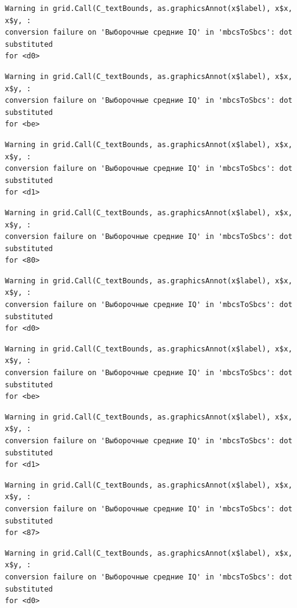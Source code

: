\documentclass[
  letterpaper,
]{scrbook}
\theoremstyle{definition}
\theoremstyle{remark}
\begin{document}
\begin{verbatim}
Warning in grid.Call(C_textBounds, as.graphicsAnnot(x$label), x$x, x$y, :
conversion failure on 'Выборочные средние IQ' in 'mbcsToSbcs': dot substituted
for <d0>
\end{verbatim}

\begin{verbatim}
Warning in grid.Call(C_textBounds, as.graphicsAnnot(x$label), x$x, x$y, :
conversion failure on 'Выборочные средние IQ' in 'mbcsToSbcs': dot substituted
for <be>
\end{verbatim}

\begin{verbatim}
Warning in grid.Call(C_textBounds, as.graphicsAnnot(x$label), x$x, x$y, :
conversion failure on 'Выборочные средние IQ' in 'mbcsToSbcs': dot substituted
for <d1>
\end{verbatim}

\begin{verbatim}
Warning in grid.Call(C_textBounds, as.graphicsAnnot(x$label), x$x, x$y, :
conversion failure on 'Выборочные средние IQ' in 'mbcsToSbcs': dot substituted
for <80>
\end{verbatim}

\begin{verbatim}
Warning in grid.Call(C_textBounds, as.graphicsAnnot(x$label), x$x, x$y, :
conversion failure on 'Выборочные средние IQ' in 'mbcsToSbcs': dot substituted
for <d0>
\end{verbatim}

\begin{verbatim}
Warning in grid.Call(C_textBounds, as.graphicsAnnot(x$label), x$x, x$y, :
conversion failure on 'Выборочные средние IQ' in 'mbcsToSbcs': dot substituted
for <be>
\end{verbatim}

\begin{verbatim}
Warning in grid.Call(C_textBounds, as.graphicsAnnot(x$label), x$x, x$y, :
conversion failure on 'Выборочные средние IQ' in 'mbcsToSbcs': dot substituted
for <d1>
\end{verbatim}

\begin{verbatim}
Warning in grid.Call(C_textBounds, as.graphicsAnnot(x$label), x$x, x$y, :
conversion failure on 'Выборочные средние IQ' in 'mbcsToSbcs': dot substituted
for <87>
\end{verbatim}

\begin{verbatim}
Warning in grid.Call(C_textBounds, as.graphicsAnnot(x$label), x$x, x$y, :
conversion failure on 'Выборочные средние IQ' in 'mbcsToSbcs': dot substituted
for <d0>
\end{verbatim}
\end{document}
